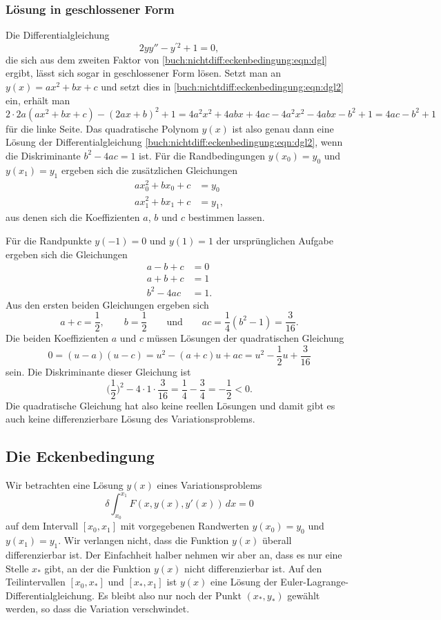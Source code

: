 %
%
\subsubsection{Lösung in geschlossener Form}
Die Differentialgleichung
\begin{equation}
2yy'' - y^{\prime 2} + 1 = 0,
\label{buch:nichtdiff:eckenbedingung:eqn:dgl2}
\end{equation}
die sich aus dem zweiten Faktor von
\eqref{buch:nichtdiff:eckenbedingung:eqn:dgl}
ergibt, lässt sich sogar in geschlossener Form lösen.
Setzt man an $y(x)=ax^2+bx+c$ und setzt dies in
\eqref{buch:nichtdiff:eckenbedingung:eqn:dgl2} ein, erhält man
\[
2\cdot2a(ax^2+bx+c) - (2ax+b)^2 + 1 
=
4a^2x^2 + 4abx + 4ac - 4a^2x^2 -4abx-b^2 + 1
=
4ac-b^2+1
\]
für die linke Seite.
Das quadratische Polynom $y(x)$ ist also genau dann eine Lösung
der Differentialgleichung
\eqref{buch:nichtdiff:eckenbedingung:eqn:dgl2},
wenn die Diskriminante $b^2-4ac=1$ ist.
Für die Randbedingungen $y(x_0)=y_0$ und $y(x_1)=y_1$ ergeben sich die
zusätzlichen Gleichungen
\begin{equation*}
\begin{aligned}
ax_0^2+bx_0+c&=y_0
\\
ax_1^2+bx_1+c&=y_1,
\end{aligned}
\end{equation*}
aus denen sich die Koeffizienten $a$, $b$ und $c$ bestimmen lassen.

Für die Randpunkte $y(-1)=0$ und $y(1)=1$ der ursprünglichen Aufgabe
ergeben sich die Gleichungen
\begin{align*}
a-b+c&=0\\
a+b+c&=1\\
b^2-4ac&=1.
\end{align*}
Aus den ersten beiden Gleichungen ergeben sich
\[
a+c=\frac12, \qquad b=\frac12
\qquad\text{und}\qquad
ac = \frac14(b^2-1) = \frac{3}{16}.
\]
Die beiden Koeffizienten $a$ und $c$ müssen Lösungen der
quadratischen Gleichung
\[
0
=
(u-a)(u-c)
=
u^2 -(a+c)u+ac
=
u^2-\frac12u+\frac{3}{16}
\]
sein.
Die Diskriminante dieser Gleichung ist
\[
\biggl(\frac12\biggr)^2
-4\cdot1\cdot\frac{3}{16}
=
\frac14-\frac{3}{4}
=
-\frac12
<0.
\]
Die quadratische Gleichung hat also keine reellen Lösungen und damit
gibt es auch keine differenzierbare Lösung des Variationsproblems.

%
%
\subsection{Die Eckenbedingung
\label{buch:nichtdiff:eckenbedingung:subsection:eckenbedingung}}
Wir betrachten eine Lösung $y(x)$ eines Variationsproblems 
\[
\delta
\int_{x_0}^{x_1}
F(x,y(x),y'(x))
\,dx
=
0
\]
auf dem Intervall $[x_0,x_1]$ mit vorgegebenen Randwerten 
$y(x_0)=y_0$ und $y(x_1)=y_1$.
Wir verlangen nicht, dass die Funktion $y(x)$ überall differenzierbar
ist.
Der Einfachheit halber nehmen wir aber an, dass es nur eine
Stelle $x_*$ gibt, an der die Funktion $y(x)$ nicht differenzierbar ist.
Auf den Teilintervallen $[x_0,x_*]$ und $[x_*,x_1]$ ist $y(x)$ eine
Lösung der Euler-Lagrange-Differentialgleichung.
Es bleibt also nur noch der Punkt $(x_*,y_*)$ gewählt werden, so dass
die Variation verschwindet.

